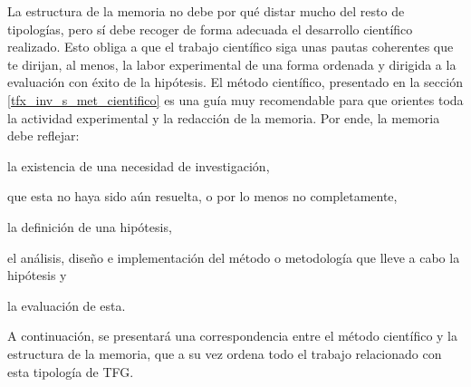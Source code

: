 La estructura de la memoria no debe por qué distar mucho del resto de tipologías, pero sí debe recoger de forma adecuada el desarrollo científico realizado. Esto obliga a que el trabajo científico siga unas pautas coherentes que te dirijan, al menos, la labor experimental de una forma ordenada y dirigida a la evaluación con éxito de la hipótesis. El método científico, presentado en la sección \ref{tfx_inv_s_met_cientifico} es una guía muy recomendable para que orientes toda la actividad experimental y la redacción de la memoria. Por ende, la memoria debe reflejar: \begin{enumerate*}[label=(\arabic*)]\item la existencia de una necesidad de investigación, \item que esta no haya sido aún resuelta, o por lo menos no completamente, \item la definición de una hipótesis, \item el análisis, diseño e implementación del método o metodología que lleve a cabo la hipótesis y \item la evaluación de esta.\end{enumerate*} A continuación, se presentará una correspondencia entre el método científico y la estructura de la memoria, que a su vez ordena todo el trabajo relacionado con esta tipología de TFG.

